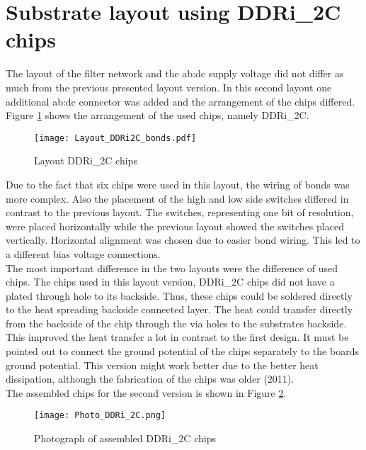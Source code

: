 \newpage
\section{Substrate layout using DDRi\_2C chips}
The layout of the filter network and the \gls{ab:dc} supply voltage did not differ as much from the previous presented layout version.
In this second layout one additional \gls{ab:dc} connector was added and the arrangement of the chips differed.
Figure \ref{fig:layoutDDRi2Cbond} shows the arrangement of the used chips, namely DDRi\_2C.


\begin{figure}[htb!]
	\centering
  \texttt{[image: Layout\_DDRi2C\_bonds.pdf]}
	\caption{Layout DDRi\_2C chips}
	\label{fig:layoutDDRi2Cbond}
\end{figure}

Due to the fact that six chips were used in this layout, the wiring of bonds was more complex.
Also the placement of the high and low side switches differed in contrast to the previous layout.
The switches, representing one bit of resolution, were placed horizontally while the previous layout showed the switches placed vertically.
Horizontal alignment was chosen due to easier bond wiring.
This led to a different bias voltage connections.\\

The most important difference in the two layouts were the difference of used chips.
The chips used in this layout version, DDRi\_2C chips did not have a plated through hole to its backside.
Thus, these chips could be soldered directly to the heat spreading backside connected layer.
The heat could transfer directly from the backside of the chip through the via holes to the substrates backside.
This improved the heat transfer a lot in contrast to the first design.
It must be pointed out to connect the ground potential of the chips separately to the boards ground potential.
This version might work better due to the better heat dissipation, although the fabrication of the chips was older (2011).\\
The assembled chips for the second version is shown in Figure \ref{fig:photoDDRi2Cbond}.

\begin{figure}[htb!] %
	\centering
  \texttt{[image: Photo\_DDRi\_2C.png]}
	\caption{Photograph of assembled DDRi\_2C chips}
	\label{fig:photoDDRi2Cbond}
\end{figure}

